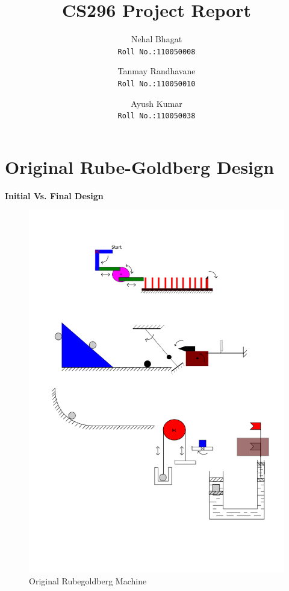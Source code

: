\documentclass[a4paper,11pt]{article}
\title{CS296 Project Report}
\author{
  Nehal Bhagat\\
  \texttt{Roll No.:110050008}\\
  \and
  Tanmay Randhavane\\
  \texttt{Roll No.:110050010}\\
  \and
  Ayush Kumar\\
  \texttt{Roll No.:110050038}\\
}
\begin{document}
\maketitle

\newpage


\tableofcontents
\newpage

\section{Original Rube-Goldberg Design}
{
\textbf{Initial Vs. Final Design}
\begin{figure}[h]
    \centering
    \includegraphics[scale=0.45]{images/rube-goldberg}
    \caption{Original Rubegoldberg Machine}
\end{figure}
  
}
\end{document}
